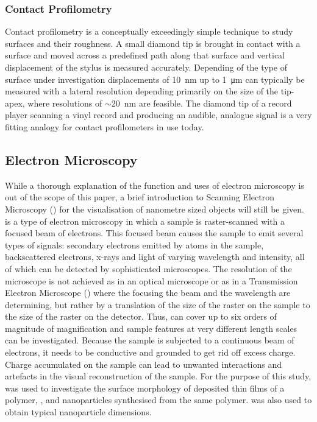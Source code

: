 \subsubsection{Contact Profilometry}
Contact profilometry is a conceptually exceedingly simple technique to study surfaces and their roughness. A small diamond tip is brought in contact with a surface and moved across a predefined path along that surface and vertical displacement of the stylus is measured accurately. Depending of the type of surface under investigation displacements of \SI{10}{\nano\metre} up to \SI{1}{\micro\metre} can typically be measured with a lateral resolution depending primarily on the size of the tip-apex, where resolutions of $\sim$\SI{20}{\nano\metre} are feasible. The diamond tip of a record player scanning a vinyl record and producing an audible, analogue signal is a very fitting analogy for contact profilometers in use today.
\subsection{Electron Microscopy}
While a thorough explanation of the function and uses of electron microscopy is out of the scope of this paper, a brief introduction to Scanning Electron Microscopy (\sem{}) for the visualisation of nanometre sized objects will still be given. \sem{} is a type of electron microscopy in which a sample is raster-scanned with a focused beam of electrons. This focused beam causes the sample to emit several types of signals: secondary electrons emitted by atoms in the sample, backscattered electrons, x-rays and light of varying wavelength and intensity, all of which can be detected by sophisticated microscopes. The resolution of the microscope is not achieved as in an optical microscope or as in a Transmission Electron Microscope (\tem{}) where the focusing the beam and the wavelength are determining, but rather by a translation of the size of the raster on the sample to the size of the raster on the detector. Thus, \sem{} can cover up to six orders of magnitude of magnification and sample features at very different length scales can be investigated. Because the sample is subjected to a continuous beam of electrons, it needs to be conductive and grounded to get rid off excess charge. Charge accumulated on the sample can lead to unwanted interactions and artefacts in the visual reconstruction of the sample. For the purpose of this study, \sem{} was used to investigate the surface morphology of deposited thin films of a polymer, \pvdf{}, and nanoparticles synthesised from the same polymer. \sem{} was also used to obtain typical nanoparticle dimensions.
